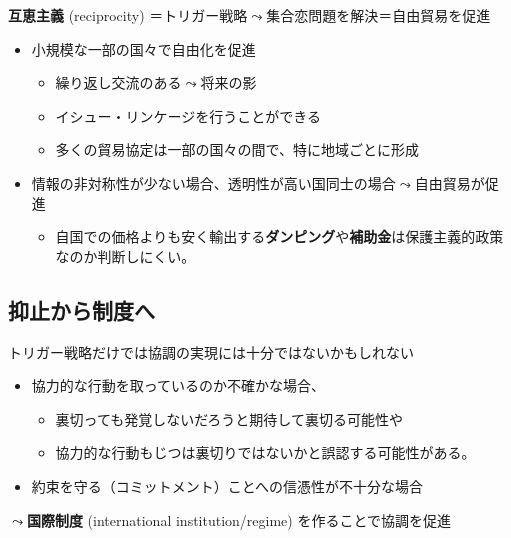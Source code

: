 \documentclass[
  xelatex,
  ja=standard]{bxjsarticle}
\providecommand{\tightlist}{%
  \setlength{\itemsep}{0pt}\setlength{\parskip}{0pt}}\usepackage{longtable,booktabs,array}
\begin{document}
\textbf{互恵主義} (reciprocity)
＝トリガー戦略\(\leadsto\)集合恋問題を解決＝自由貿易を促進

\begin{itemize}
\tightlist
\item
  小規模な一部の国々で自由化を促進\citep{snidal1985}

  \begin{itemize}
  \tightlist
  \item
    繰り返し交流のある\(\leadsto\)将来の影
  \item
    イシュー・リンケージを行うことができる
  \item
    多くの貿易協定は一部の国々の間で、特に地域ごとに形成
  \end{itemize}
\item
  情報の非対称性が少ない場合、透明性が高い国同士の場合\(\leadsto\)自由貿易が促進

  \begin{itemize}
  \tightlist
  \item
    自国での価格よりも安く輸出する\textbf{ダンピング}や\textbf{補助金}は保護主義的政策なのか判断しにくい。
  \end{itemize}
\end{itemize}

\hypertarget{ux6291ux6b62ux304bux3089ux5236ux5ea6ux3078}{%
\subsection{抑止から制度へ}\label{ux6291ux6b62ux304bux3089ux5236ux5ea6ux3078}}

トリガー戦略だけでは協調の実現には十分ではないかもしれない

\begin{itemize}
\tightlist
\item
  協力的な行動を取っているのか不確かな場合、

  \begin{itemize}
  \tightlist
  \item
    裏切っても発覚しないだろうと期待して裏切る可能性や
  \item
    協力的な行動もじつは裏切りではないかと誤認する可能性がある。
  \end{itemize}
\item
  約束を守る（コミットメント）ことへの信憑性が不十分な場合
\end{itemize}

\(\leadsto\)\textbf{国際制度} (international institution/regime)
を作ることで協調を促進
\end{document}
